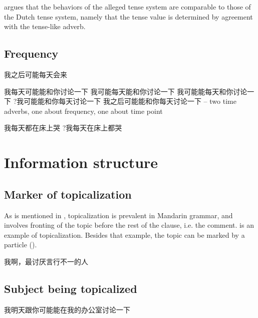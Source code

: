 \documentclass[UTF8, a4paper, oneside, scheme=plain, 12pt]{ctexrep}
\begin{document}
\citet{sybesma2007whether} argues that the behaviors of the alleged tense system
are comparable to those of the Dutch tense system,
namely that the tense value is determined by agreement with the tense-like adverb.

\section{Frequency}

\begin{exe}
    \ex 我之后可能每天会来 

    \ex *我每天可能能和你讨论一下
    \ex 我可能每天能和你讨论一下 
    \ex 我可能能每天和你讨论一下 
    \ex ?我可能能和你每天讨论一下
    \ex 我之后可能能和你每天讨论一下 -- two time adverbs, one about frequency, one about time point 
\end{exe}

\begin{exe}
    \ex 我每天都在床上哭
    \ex ?我每天在床上都哭
\end{exe}

\chapter{Information structure}

\section{Marker of topicalization}


As is mentioned in ,
topicalization is prevalent in Mandarin grammar,
and involves fronting of the topic before the rest of the clause, i.e. the comment.
 is an example of topicalization.
Besides that example, the topic can be marked by a particle
().

\begin{exe}
    \ex\label{ex:information.topic.marker.1} 我啊，最讨厌言行不一的人
\end{exe}

\section{Subject being topicalized}\label{sec:topic.subject}

\begin{exe}
    \ex 我明天跟你可能能在我的办公室讨论一下
\end{exe}
\end{document}

